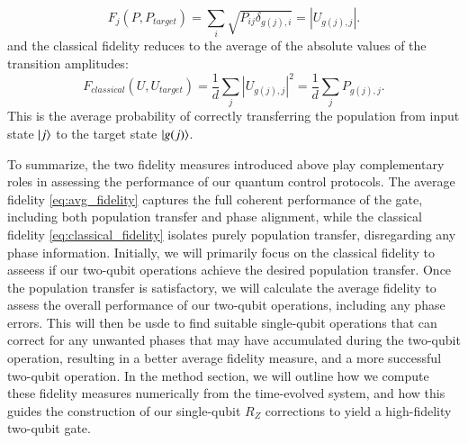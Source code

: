 \documentclass{subfiles}
\begin{document}
\begin{itemize}
    \begin{equation*}
        F_j(P, P_{target}) = \sum_i \sqrt{P_{ij} \delta_{g(j),i}} = |U_{g(j), j}|.
    \end{equation*}
    and the classical fidelity reduces to the average of the absolute values of the transition amplitudes:
    \begin{equation}
        F_{classical}(U, U_{target}) = \frac{1}{d}\sum_j |U_{g(j), j}|^2 = \frac{1}{d}\sum_j P_{g(j), j}\label{eq:classical_fidelity_deterministic}.
    \end{equation}
    This is the average probability of correctly transferring the population from input state $\ket{j}$ to the target state $\ket{g(j)}$. 
\end{itemize}
To summarize, the two fidelity measures introduced above play complementary roles in assessing the performance of our quantum control protocols. The average fidelity \eqref{eq:avg_fidelity} captures the full coherent performance of the gate, including both population transfer and phase alignment, while the classical fidelity \eqref{eq:classical_fidelity} isolates purely population transfer, disregarding any phase information. Initially, we will primarily focus on the classical fidelity to asseess if our two-qubit operations achieve the desired population transfer. Once the population transfer is satisfactory, we will calculate the average fidelity to assess the overall performance of our two-qubit operations, including any phase errors. This will then be usde to find suitable single-qubit operations that can correct for any unwanted phases that may have accumulated during the two-qubit operation, resulting in a better average fidelity measure, and a more successful two-qubit operation. In the method section, we will outline how we compute these fidelity measures numerically from the time-evolved system, and how this guides the construction of our single-qubit $R_Z$ corrections to yield a high-fidelity two-qubit gate.
\end{document}
